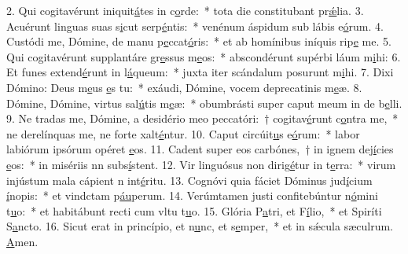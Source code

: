 2. Qui cogitavérunt iniquit\uline{á}tes in c\uline{o}rde:~* tota die constitubant pr\uline{ǽ}lia.
3. Acuérunt linguas suas s\uline{i}cut serp\uline{é}ntis:~* venénum áspidum sub lábis e\uline{ó}rum.
4. Custódi me, Dómine, de manu p\uline{e}ccat\uline{ó}ris:~* et ab homínibus iníquis rip\uline{e} me.
5. Qui cogitavérunt supplantáre gr\uline{e}ssus m\uline{e}os:~* abscondérunt supérbi láum m\uline{i}hi:
6. Et funes extend\uline{é}runt in l\uline{á}queum:~* juxta iter scándalum posurunt m\uline{i}hi.
7. Dixi Dómino: Deus m\uline{e}us \uline{e}s tu:~* exáudi, Dómine, vocem deprecatinis m\uline{e}æ.
8. Dómine, Dómine, virtus sal\uline{ú}tis m\uline{e}æ:~* obumbrásti super caput meum in de b\uline{e}lli.
9. Ne tradas me, Dómine, a desidério meo peccatóri:~† cogitav\uline{é}runt c\uline{o}ntra me,~* ne derelínquas me, ne forte xalt\uline{é}ntur.
10. Caput circúit\uline{u}s e\uline{ó}rum:~* labor labiórum ipsórum opéret \uline{e}os.
11. Cadent super eos carbónes,~† in ignem dej\uline{í}cies \uline{e}os:~* in misériis nn subs\uline{í}stent.
12. Vir linguósus non dirig\uline{é}tur in t\uline{e}rra:~* virum injústum mala cápient n int\uline{é}ritu.
13. Cognóvi quia fáciet Dóminus jud\uline{í}cium \uline{í}nopis:~* et vindctam p\uline{áu}perum.
14. Verúmtamen justi confitebúntur n\uline{ó}mini t\uline{u}o:~* et habitábunt recti cum vltu t\uline{u}o.
15. Glória P\uline{a}tri, et F\uline{í}lio,~* et Spiríti S\uline{a}ncto.
16. Sicut erat in princípio, et n\uline{u}nc, et s\uline{e}mper,~* et in sǽcula sæculrum. \uline{A}men.
